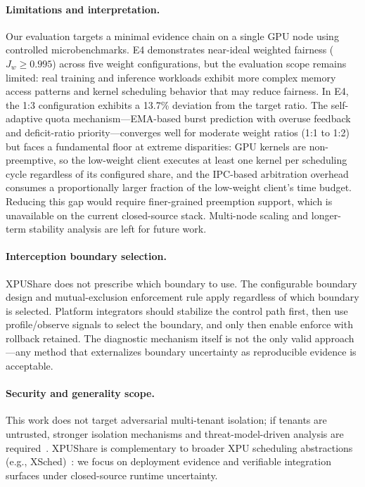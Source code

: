 \documentclass[runningheads,a4paper]{llncs}
\begin{document}
\paragraph{Limitations and interpretation.}
Our evaluation targets a minimal evidence chain on a single GPU node using
controlled microbenchmarks. E4 demonstrates near-ideal weighted fairness
($J_w{\geq}0.995$) across five weight configurations, but the evaluation
scope remains limited: real training and inference workloads exhibit more
complex memory access patterns and kernel scheduling behavior that may
reduce fairness.
	In E4, the 1{:}3 configuration exhibits a 13.7\% deviation from the
	target ratio. The self-adaptive quota mechanism---EMA-based burst
	prediction with overuse feedback and deficit-ratio priority---converges
	well for moderate weight ratios (1{:}1 to 1{:}2) but faces a
	fundamental floor at extreme disparities: GPU kernels are
	non-preemptive, so the low-weight client executes at least one kernel
	per scheduling cycle regardless of its configured share, and the
	IPC-based arbitration overhead consumes a proportionally larger
	fraction of the low-weight client's time budget. Reducing this gap
	would require finer-grained preemption support, which is unavailable
	on the current closed-source stack.
	Multi-node scaling and longer-term stability analysis are
left for future work.

\paragraph{Interception boundary selection.}
XPUShare does not prescribe which boundary to use. The configurable
boundary design and mutual-exclusion enforcement rule apply regardless of
which boundary is selected. Platform integrators should stabilize the
control path first, then use profile/observe signals to select the
boundary, and only then enable enforce with rollback retained. The
diagnostic mechanism itself is not the only valid approach---any
method that externalizes boundary uncertainty as reproducible evidence
is acceptable.

\paragraph{Security and generality scope.}
This work does not target adversarial multi-tenant isolation; if tenants
are untrusted, stronger isolation mechanisms and threat-model-driven
analysis are required~\cite{guardian}. XPUShare is complementary to broader
XPU scheduling abstractions (e.g., XSched)~\cite{xsched}: we focus on
deployment evidence and verifiable integration surfaces under closed-source
runtime uncertainty.
\end{document}
